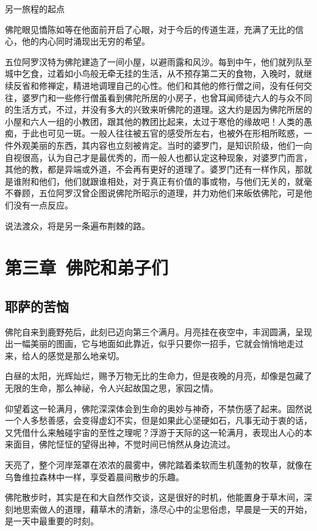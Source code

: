 \documentclass[12pt,twoside,openany]{book}
\begin{document}
另一旅程的起点

佛陀眼见憍陈如等在他面前开启了心眼，对于今后的传道生涯，充满了无比的信心，他的内心同时涌现出无穷的希望。

五位阿罗汉特为佛陀建造了一间小屋，以避雨露和风沙。每到中午，他们就列队至城中乞食，过着如小鸟般无牵无挂的生活，从不预存第二天的食物，入晚时，就继续反省和修禅定，精进地调理自己的心性。他们和其他的修行僧之间，没有任何交往，婆罗门和一些修行僧虽看到佛陀所居的小房子，也曾耳闻师徒六人的与众不同的生活方式，不过，并没有多大的兴致来听佛陀的道理。这大约是因为佛陀所居的小屋和六人一组的小教团，跟其他的教团比起来，太过于寒伧的缘故吧！人类的愚痴，于此也可见一斑。一般人往往被五官的感受所左右，也被外在形相所眩惑，一件外观美丽的东西，其内容也立刻被肯定。当时的婆罗门，是知识阶级，他们一向自视很高，认为自己才是最优秀的，而一般人也都认定这种现象，对婆罗门而言，其他的教，都是异端或外道，不会再有更好的道理了。婆罗门还有一样作风，那就是谁附和他们，他们就跟谁相处，对于真正有价值的事或物，与他们无关的，就毫不眷顾，五位阿罗汉曾企图说佛陀所昭示的道理，并力劝他们来皈依佛陀，可是他们没有一点反应。

说法渡众，将是另一条遍布荆棘的路。	



\chapter{第三章\ 佛陀和弟子们}\label{ch3}

\section{耶萨的苦恼}\label{sec3.1}

佛陀自来到鹿野苑后，此刻已迈向第三个满月。月亮挂在夜空中，丰润圆满，呈现出一幅美丽的图画，它与地面如此靠近，似乎只要你一招手，它就会悄悄地走过来，给人的感觉是那么地亲切。

白昼的太阳，光辉灿烂，赐予万物无比的生命力，但是夜晚的月亮，却像是包藏了无限的生命，那么神祕，令人兴起故国之思，家园之情。

仰望着这一轮满月，佛陀深深体会到生命的奥妙与神奇，不禁伤感了起来。固然说一个人多愁善感，会变得虚幻不实，但是如果此心坚硬如石，凡事无动于衷的话，又凭借什么来触碰宇宙的至性之理呢？浮游于天际的这一轮满月，表现出人心的本来面目，佛陀怔怔的望得出神，不觉时间已悄然从身边流过。

天亮了，整个河岸笼罩在浓浓的晨雾中，佛陀踏着柔软而生机蓬勃的牧草，就像在乌鲁维拉森林中一样，享受着晨间散步的乐趣。

佛陀散步时，其实是在和大自然作交谈，这是很好的时机，他能置身于草木间，深刻地思索做人的道理，藉草木的清新，涤尽心中的尘思俗虑，早晨是一天的开始，是一天中最重要的时刻。
\end{document}
